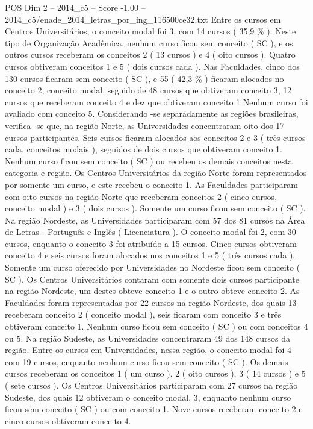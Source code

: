 \begin{textsample}{POS Dim 2 – 2014\_c5 – Score -1.00 – 2014\_c5/enade\_2014\_letras\_por\_ing\_116500ce32.txt}
Entre os cursos em Centros Universitários, o conceito modal foi 3, com 14 cursos ( 35,9 \% ).
Neste tipo de Organização Acadêmica, nenhum curso ficou sem conceito ( SC ), e os outros cursos receberam os conceitos 2 ( 13 cursos ) e 4 ( oito cursos ).
Quatro cursos obtiveram conceitos 1 e 5 ( dois cursos cada ).
Nas Faculdades, cinco dos 130 cursos ficaram sem conceito ( SC ), e 55 ( 42,3 \% ) ficaram alocados no conceito 2, conceito modal, seguido de 48 cursos que obtiveram conceito 3, 12 cursos que receberam conceito 4 e dez que obtiveram conceito 1 Nenhum curso foi avaliado com conceito 5.
Considerando -se separadamente as regiões brasileiras, verifica -se que, na região Norte, as Universidades concentraram oito dos 17 cursos participantes.
Seis cursos ficaram alocados aos conceitos 2 e 3 ( três cursos cada, conceitos modais ), seguidos de dois cursos que obtiveram conceito 1.
Nenhum curso ficou sem conceito ( SC ) ou recebeu os demais conceitos nesta categoria e região.
Os Centros Universitários da região Norte foram representados por somente um curso, e este recebeu o conceito 1.
As Faculdades participaram com oito cursos na região Norte que receberam conceitos 2 ( cinco cursos, conceito modal ) e 3 ( dois cursos ).
Somente um curso ficou sem conceito ( SC ).
Na região Nordeste, as Universidades participaram com 57 dos 81 cursos na Área de Letras - Português e Inglês ( Licenciatura ).
O conceito modal foi 2, com 30 cursos, enquanto o conceito 3 foi atribuído a 15 cursos.
Cinco cursos obtiveram conceito 4 e seis cursos foram alocados nos conceitos 1 e 5 ( três cursos cada ).
Somente um curso oferecido por Universidades no Nordeste ficou sem conceito ( SC ).
Os Centros Universitários contaram com somente dois cursos participante na região Nordeste, um destes obteve conceito 1 e o outro obteve conceito 2.
As Faculdades foram representadas por 22 cursos na região Nordeste, dos quais 13 receberam conceito 2 ( conceito modal ), seis ficaram com conceito 3 e três obtiveram conceito 1.
Nenhum curso ficou sem conceito ( SC ) ou com conceitos 4 ou 5.
Na região Sudeste, as Universidades concentraram 49 dos 148 cursos da região.
Entre os cursos em Universidades, nessa região, o conceito modal foi 4 com 19 cursos, enquanto nenhum curso ficou sem conceito ( SC ).
Os demais cursos receberam os conceitos 1 ( um curso ), 2 ( oito cursos ), 3 ( 14 cursos ) e 5 ( sete cursos ).
Os Centros Universitários participaram com 27 cursos na região Sudeste, dos quais 12 obtiveram o conceito modal, 3, enquanto nenhum curso ficou sem conceito ( SC ) ou com conceito 1.
Nove cursos receberam conceito 2 e cinco cursos obtiveram conceito 4.

\end{textsample}
